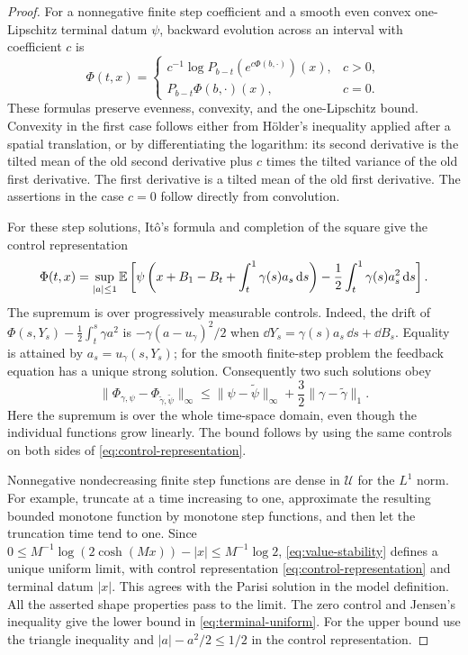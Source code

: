 \begin{proof}
For a nonnegative finite step coefficient and a smooth even convex
one-Lipschitz terminal datum $\psi$, backward evolution across an
interval with coefficient $c$ is
\begin{equation}
 \Phi(t,x)=
 \begin{cases}
 c^{-1}\log P_{b-t}(e^{c\Phi(b,\cdot)})(x),&c>0,\\
 P_{b-t}\Phi(b,\cdot)(x),&c=0.
 \end{cases}
 \label{eq:constant-heat}
\end{equation}
These formulas preserve evenness, convexity, and the one-Lipschitz
bound.  Convexity in the first case follows either from H\"older's
inequality applied after a spatial translation, or by differentiating
the logarithm: its second derivative is the tilted mean of the old
second derivative plus $c$ times the tilted variance of the old first
derivative.  The first derivative is a tilted mean of the old first
derivative.  The assertions in the case $c=0$ follow directly from
convolution.

For these step solutions, It\^o's formula and completion of the square
give the control representation
\begin{equation}
 \Phi(t,x)=\sup_{|a|\leq1}\mathbb E\left[
 \psi\left(x+B_1-B_t+\int_t^1\gamma(s)a_s\,\mathrm d s\right)
 -\frac12\int_t^1\gamma(s)a_s^2\,\mathrm d s\right].
 \label{eq:control-representation}
\end{equation}
The supremum is over progressively measurable controls.  Indeed, the
drift of $\Phi(s,Y_s)-\frac12\int_t^s\gamma a^2$ is
$-\gamma(a-u_\gamma)^2/2$ when
$\dd Y_s=\gamma(s)a_s\,\dd s+\dd B_s$.  Equality is attained by
$a_s=u_\gamma(s,Y_s)$; for the smooth finite-step problem the feedback
equation has a unique strong solution.  Consequently two such
solutions obey
\begin{equation}
 \|\Phi_{\gamma,\psi}-\Phi_{\widetilde\gamma,\widetilde\psi}
       \|_\infty
 \leq\|\psi-\widetilde\psi\|_\infty
             +\frac32\|\gamma-\widetilde\gamma\|_1.
 \label{eq:value-stability}
\end{equation}
Here the supremum is over the whole time-space domain, even though the
individual functions grow linearly.  The bound follows by using the
same controls on both sides of \eqref{eq:control-representation}.

Nonnegative nondecreasing finite step functions are dense in
$\mathcal U$ for the $L^1$ norm.  For example, truncate at a time
increasing to one, approximate the resulting bounded monotone
function by monotone step functions, and then let the truncation time
tend to one.  Since
$0\leq M^{-1}\log(2\cosh(Mx))-|x|\leq M^{-1}\log2$,
\eqref{eq:value-stability} defines a unique uniform limit, with control
representation \eqref{eq:control-representation} and terminal datum
$|x|$.  This agrees with the Parisi solution in the model definition.
All the asserted shape properties pass to the limit.  The zero control
and Jensen's inequality give the lower bound in
\eqref{eq:terminal-uniform}.  For the upper bound use the triangle
inequality and $|a|-a^2/2\leq1/2$ in the control representation.


\end{proof}

